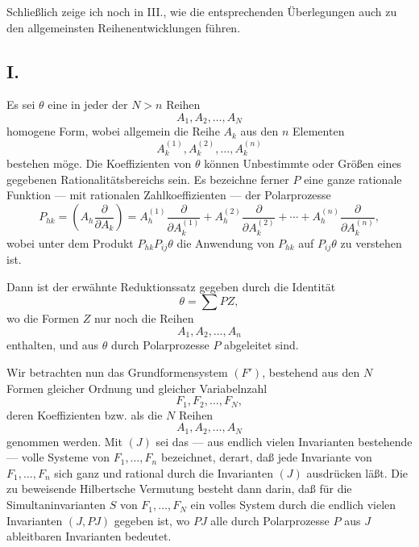 \documentclass[11pt]{article}
\begin{document}
Schließlich zeige ich noch in III., wie die entsprechenden Überlegungen auch zu den allgemeinsten Reihenentwicklungen führen.

\subsection*{I.}
Es sei $\theta$ eine in jeder der $N>n$ Reihen
\[
  A_1,A_2,\ldots,A_N
\]
homogene Form, wobei allgemein die Reihe $A_k$ aus den $n$ Elementen
\[
  A_k^{(1)},A_k^{(2)},\ldots,A_k^{(n)}
\]
bestehen möge. Die Koeffizienten von $\theta$ können Unbestimmte oder Größen eines gegebenen Rationalitätsbereichs sein. Es bezeichne ferner $P$ eine ganze rationale Funktion --- mit rationalen Zahlkoeffizienten --- der Polarprozesse
\[
  P_{hk}=\left(A_h\frac{\partial}{\partial A_k}\right)
  =A_h^{(1)}\frac{\partial}{\partial A_k^{(1)}}+
   A_h^{(2)}\frac{\partial}{\partial A_k^{(2)}}+
   \cdots+
   A_h^{(n)}\frac{\partial}{\partial A_k^{(n)}},
\]
wobei unter dem Produkt $P_{hk}P_{ij}\theta$ die Anwendung von $P_{hk}$ auf $P_{ij}\theta$ zu verstehen ist.

Dann ist der erwähnte Reduktionssatz gegeben durch die Identität
\begin{equation}
  \theta=\sum PZ,
\tag{1}
\end{equation}
wo die Formen $Z$ nur noch die Reihen
\[
  A_1,A_2,\ldots,A_n
\]
enthalten, und aus $\theta$ durch Polarprozesse $P$ abgeleitet sind.

Wir betrachten nun das Grundformensystem $(F')$, bestehend aus den $N$ Formen gleicher Ordnung und gleicher Variabelnzahl
\[
  F_1,F_2,\ldots,F_N,
\]
deren Koeffizienten bzw. als die $N$ Reihen
\[
  A_1,A_2,\ldots,A_N
\]
genommen werden. Mit $(J)$ sei das --- aus endlich vielen Invarianten bestehende --- volle Systeme von $F_1,\ldots,F_n$ bezeichnet, derart, daß jede Invariante von $F_1,\ldots,F_n$ sich ganz und rational durch die Invarianten $(J)$ ausdrücken läßt. Die zu beweisende Hilbertsche Vermutung besteht dann darin, daß für die Simultaninvarianten $S$ von $F_1,\ldots,F_N$ ein volles System durch die endlich vielen Invarianten $(J,PJ)$ gegeben ist, wo $PJ$ alle durch Polarprozesse $P$ aus $J$ ableitbaren Invarianten bedeutet.
\end{document}
